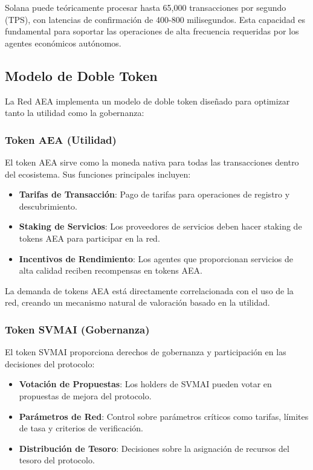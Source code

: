 \documentclass[12pt,a4paper]{article}
\begin{document}
Solana puede teóricamente procesar hasta 65,000 transacciones por segundo (TPS), con latencias de confirmación de 400-800 milisegundos. Esta capacidad es fundamental para soportar las operaciones de alta frecuencia requeridas por los agentes económicos autónomos.

\subsection{Modelo de Doble Token}

La Red AEA implementa un modelo de doble token diseñado para optimizar tanto la utilidad como la gobernanza:

\subsubsection{Token AEA (Utilidad)}

El token AEA sirve como la moneda nativa para todas las transacciones dentro del ecosistema. Sus funciones principales incluyen:

\begin{itemize}
\item \textbf{Tarifas de Transacción}: Pago de tarifas para operaciones de registro y descubrimiento.
\item \textbf{Staking de Servicios}: Los proveedores de servicios deben hacer staking de tokens AEA para participar en la red.
\item \textbf{Incentivos de Rendimiento}: Los agentes que proporcionan servicios de alta calidad reciben recompensas en tokens AEA.
\end{itemize}

La demanda de tokens AEA está directamente correlacionada con el uso de la red, creando un mecanismo natural de valoración basado en la utilidad.

\subsubsection{Token SVMAI (Gobernanza)}

El token SVMAI proporciona derechos de gobernanza y participación en las decisiones del protocolo:

\begin{itemize}
\item \textbf{Votación de Propuestas}: Los holders de SVMAI pueden votar en propuestas de mejora del protocolo.
\item \textbf{Parámetros de Red}: Control sobre parámetros críticos como tarifas, límites de tasa y criterios de verificación.
\item \textbf{Distribución de Tesoro}: Decisiones sobre la asignación de recursos del tesoro del protocolo.
\end{itemize}
\end{document}
